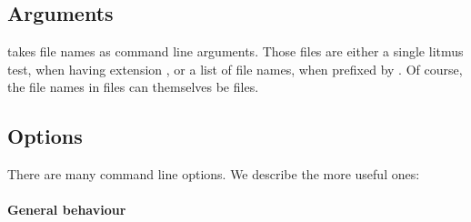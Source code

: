\subsection*{Arguments\label{file:argument}}
\litmus{} takes file names as command line arguments.
Those files are either a single litmus test,
when having extension ,
or a list of file names, when prefixed by .
Of course, the file names in files can themselves be
files.

\subsection*{Options}
There are many command line options.
We describe the more useful ones:

\paragraph*{General \label{general:bahaviour}behaviour}
